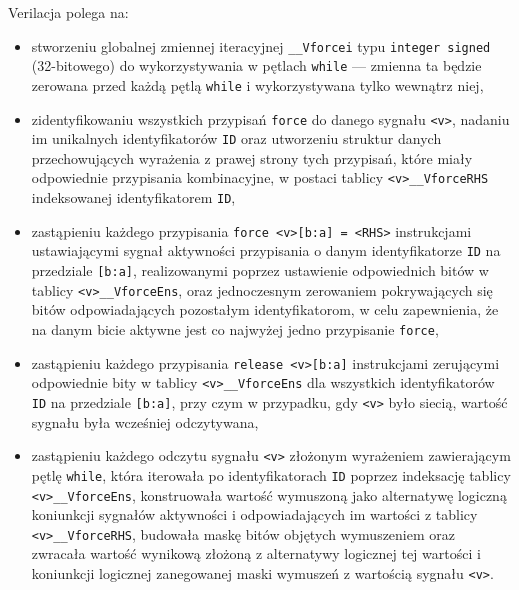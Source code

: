 \documentclass[shortabstract, inz]{iithesis}
\begin{document}
Verilacja polega na:
\begin{itemize}
    \item stworzeniu globalnej zmiennej iteracyjnej \texttt{\_\_Vforcei} typu \texttt{integer signed} (32-bitowego) do wykorzystywania w pętlach \texttt{while} --- zmienna ta będzie zerowana przed każdą pętlą \texttt{while} i wykorzystywana tylko wewnątrz niej,
    \item zidentyfikowaniu wszystkich przypisań \texttt{force} do danego sygnału \texttt{<v>}, nadaniu im unikalnych identyfikatorów \texttt{ID} oraz utworzeniu struktur danych przechowujących wyrażenia z prawej strony tych przypisań, które miały odpowiednie przypisania kombinacyjne, w postaci tablicy \texttt{<v>\_\_VforceRHS} indeksowanej identyfikatorem \texttt{ID},
    \item zastąpieniu każdego przypisania \texttt{force <v>[b:a] = <RHS>} instrukcjami ustawiającymi sygnał aktywności przypisania o danym identyfikatorze \texttt{ID} na przedziale \texttt{[b:a]}, realizowanymi poprzez ustawienie odpowiednich bitów w tablicy \texttt{<v>\_\_VforceEns}, oraz jednoczesnym zerowaniem pokrywających się bitów odpowiadających pozostałym identyfikatorom, w celu zapewnienia, że na danym bicie aktywne jest co najwyżej jedno przypisanie \texttt{force},
    \item zastąpieniu każdego przypisania \texttt{release <v>[b:a]} instrukcjami zerującymi odpowiednie bity w tablicy \texttt{<v>\_\_VforceEns} dla wszystkich identyfikatorów \texttt{ID} na przedziale \texttt{[b:a]}, przy czym w przypadku, gdy \texttt{<v>} było siecią, wartość sygnału była wcześniej odczytywana,
    \item zastąpieniu każdego odczytu sygnału \texttt{<v>} złożonym wyrażeniem zawierającym pętlę \texttt{while}, która iterowała po identyfikatorach \texttt{ID} poprzez indeksację tablicy \texttt{<v>\_\_VforceEns}, konstruowała wartość wymuszoną jako alternatywę logiczną koniunkcji sygnałów aktywności i odpowiadających im wartości z tablicy \texttt{<v>\_\_VforceRHS}, budowała maskę bitów objętych wymuszeniem oraz zwracała wartość wynikową złożoną z alternatywy logicznej tej wartości i koniunkcji logicznej zanegowanej maski wymuszeń z wartością sygnału \texttt{<v>}.



\end{itemize}
\end{document}
